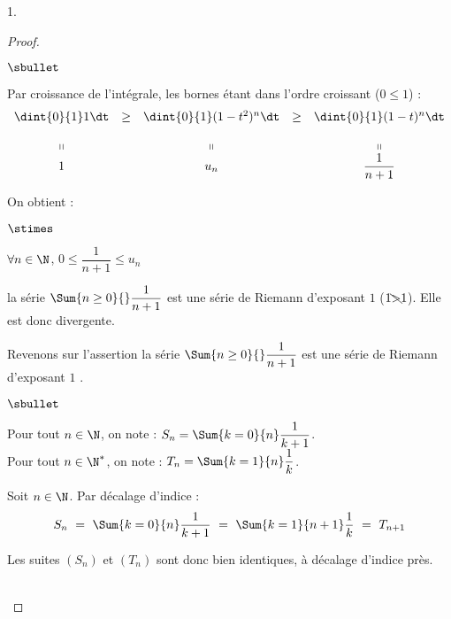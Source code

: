 \documentclass[11pt]{article}%
\begin{document}
\begin{noliste}{1.}
\begin{proof}
\begin{noliste}{$\sbullet$}
    \item Par croissance de l'intégrale, les bornes étant dans l'ordre
      croissant ($0 \leq 1$) :
      \[
        \begin{array}{ccccc}
          \dint{0}{1} 1 \dt & \geq & \dint{0}{1} (1-t^2)^n \dt
          & \geq & \dint{0}{1} (1-t)^n \dt
          \\[.4cm]
          \shortparallel & & \shortparallel & & \shortparallel
          \\
          1 & & u_n & & \dfrac{1}{n+1}
        \end{array}
      \]
      
    \item On obtient :
      \begin{noliste}{$\stimes$}
      \item $\forall n \in \N$, $0 \leq \dfrac{1}{n+1} \leq u_n$
        
      \item la série $\Sum{n\geq 0}{} \dfrac{1}{n+1}$ est une série de
        Riemann d'exposant $1$ ($1 \bcancel{>} 1$). Elle est
        donc divergente.
      \end{noliste}
    \end{noliste}
    \begin{remark}
      Revenons sur l'assertion \og la série $\Sum{n \geq 0}{}
      \dfrac{1}{n+1}$ est une série de Riemann d'exposant $1$ \fg{}.\\[.1cm]
      \begin{noliste}{$\sbullet$}
      \item Pour tout $n \in \N$, on note : $S_n = \Sum{k=0}{n}
        \dfrac{1}{k+1}$.\\[.2cm]
        Pour tout $n \in \N^*$, on note : $T_n = \Sum{k=1}{n} \dfrac{1}{k}$.
        
      \item Soit $n \in \N$. Par décalage d'indice :
        \[
          S_n \ = \ \Sum{k=0}{n} \dfrac{1}{k+1} \ = \ \Sum{k=1}{n+1}
          \dfrac{1}{k} \ = \ T_{n+1}
        \]
      \end{noliste}
      Les suites $(S_n)$ et $(T_n)$ sont donc bien identiques, à
      décalage d'indice près.
    \end{remark}~\\[-1.4cm]
  \end{proof}



\end{noliste}
\end{document}

